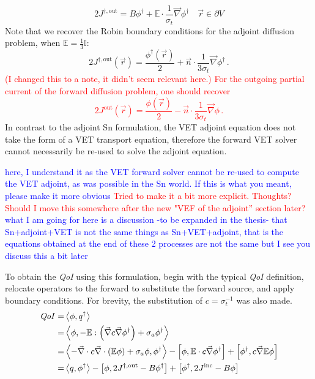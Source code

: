 \documentclass[12pt]{report}
\newcommand{\vr}{\vec{r}}
\newcommand{\bra}{\left\langle}
\newcommand{\ket}{\right\rangle}
\newcommand{\sbra}{\left[}
\newcommand{\sket}{\right]}
\renewcommand{\div}{\vec{\nabla} \cdot}
\newcommand{\grad}{\vec{\nabla}}
\newcommand{\bound}{\partial V}
\newcommand{\vn}{\vec{n}}
\newcommand{\Edd}{\mathbb{E}}
\newcommand{\sigt}{\sigma_t}
\newcommand{\siga}{\sigma_a}
\newcommand{\isigt}{c}
\newcommand{\scalSource}{q}
\newcommand{\scalResp}{q^\dag}
\newcommand{\qoi}{{\it QoI}\xspace}
\newcommand{\comment}[2]{\marginpar{\textcolor{#2}{$\star$}}\textcolor{#2}{#1}\newline}
\newcommand{\iwh}[1]{\comment{#1}{red}}
\newcommand{\jcr}[1]{\comment{#1}{blue}}
\newcommand{\iwh}[1]{\phantom{a}}
\newcommand{\jcr}[1]{\phantom{a}}
\begin{document}
\begin{equation}
\label{adjVETBC}
2J^{\dag,\text{out}} = B \phi^\dag + 
\Edd \cdot \frac{1}{\sigma_{t} } \vec{\nabla} \phi^\dag   \quad \vr \in \bound
\end{equation}
Note that we recover the Robin boundary conditions for the adjoint diffusion problem, when $\Edd = \tfrac{1}{3} \mathbb{I}$:
\[
2 J^{\dag,\text{out}}(\vr) = \frac{\phi^\dag(\vr)}{2} + \vn \cdot \frac{1}{3\sigt} \grad \phi^\dag \,.
\]
\iwh{ (I changed this to a note, it didn't seem relevant here.) For the outgoing partial current of the forward diffusion problem, one should recover
\[
2 J^{\text{out}}(\vr) = \frac{\phi(\vr)}{2} \boxed{-} \vn \cdot \frac{1}{3\sigt} \grad \phi \,.
\]}
In contrast to the adjoint Sn formulation, the VET adjoint equation does not take the form of a VET transport equation, therefore the forward VET solver 
cannot necessarily be re-used to solve the adjoint equation. 

\jcr{here, I understand it as the VET forward solver cannot be re-used to compute the VET adjoint,
as was possible in the Sn world. If this is what you meant, please make it more obvious}
\iwh{Tried to make it a bit more explicit. Thoughts? Should I move this somewhere after the new "VEF of the adjoint'' section later?} 
\jcr{what I am going for here is a discussion -to be expanded in the thesis- that Sn+adjoint+VET is not the same things as Sn+VET+adjoint, that is the equations obtained at the end
of these 2 processes are not the same but I see you discuss this a bit later}

To obtain the \qoi using this formulation, begin with the typical \qoi definition, relocate operators to the forward to substitute the forward source, and apply boundary conditions.
For brevity, the substitution of $\isigt = \sigt^{-1}$ was also made.
\begin{equation}
\label{VETQoIAdjUnpDeriv}
\begin{split}
\qoi=&\bra \phi , \scalResp \ket \\
=&\bra \phi , - \Edd : \left( \grad \isigt \grad \phi^\dag \right) + \siga \phi^\dag \ket \\
=& \bra - \div \isigt \div \left( \Edd \phi \right) + \siga \phi, \phi^\dag \ket 
- \sbra \phi, \Edd \cdot \isigt \grad \phi^\dag \sket  
+ \sbra \phi^\dag, \isigt \grad \Edd \phi \sket \\
=&\bra \scalSource , \phi^\dag \ket 
- \sbra \phi , 2J^{\dag,\text{out}} - B \phi^\dag \sket + \sbra \phi^\dag, 2J^{\text{inc}} - B \phi  \sket
\end{split}
\end{equation}
\end{document}
